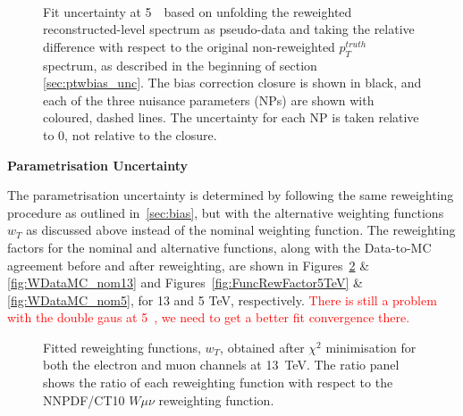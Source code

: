 \begin{figure}[h]
  \centering
   \\
  \caption{Fit uncertainty at 5~\TeV~based on unfolding the reweighted reconstructed-level \pt spectrum as pseudo-data and taking the relative difference with respect to the original non-reweighted $p_{T}^{truth}$ spectrum, as described in the beginning of section \ref{sec:ptwbias_unc}. The bias correction closure is shown in black, and each of the three nuisance parameters (NPs) are shown with coloured, dashed lines. The uncertainty for each NP is taken relative to 0, not relative to the closure.}
  \label{fig:Wbias_unc_fit5}
\end{figure}


\textbf{Parametrisation Uncertainty}

The parametrisation uncertainty is determined by following the same reweighting procedure as outlined in~\ref{sec:bias}, but with the alternative weighting functions $w_{T}$ as discussed above instead of the nominal weighting function.
The reweighting factors for the nominal and alternative functions, along with the Data-to-MC agreement before and after reweighting, are shown in Figures~\ref{fig:FuncRewFactor13TeV} \& \ref{fig:WDataMC_nom13} and Figures~\ref{fig:FuncRewFactor5TeV} \& \ref{fig:WDataMC_nom5}, for 13 and 5 TeV, respectively.
\textcolor{red}{There is still a problem with the double gaus at 5~\TeV, we need to get a better fit convergence there.}
\begin{figure}[h]
  \centering
 \caption{Fitted reweighting functions, $w_{T}$, obtained after $\chi^2$ minimisation for both the electron and muon channels at 13~TeV. The ratio panel shows the ratio of each reweighting function with respect to the NNPDF/CT10 $W\mu\nu$ reweighting function.}
  \label{fig:FuncRewFactor13TeV}
\end{figure}

